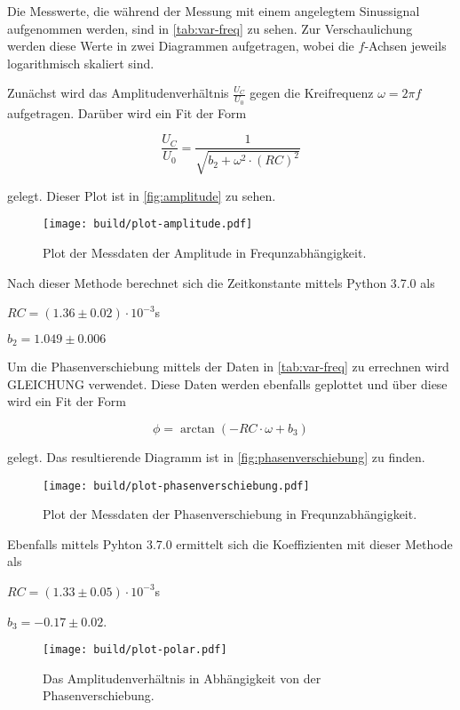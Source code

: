 Die Messwerte, die während der Messung mit einem angelegtem Sinussignal aufgenommen werden, sind in \autoref{tab:var-freq} zu sehen.
Zur Verschaulichung werden diese Werte in zwei Diagrammen aufgetragen, wobei die $f$-Achsen jeweils logarithmisch skaliert sind.



Zunächst wird das Amplitudenverhältnis $\frac{U_C}{U_0}$ gegen die Kreifrequenz $\omega = 2 \pi f$ aufgetragen. Darüber wird ein Fit der Form

\begin{equation}
    \frac{U_C}{U_0} = \frac{1}{\sqrt{ b_2 + \omega^2 \cdot (RC)^2 }}
\end{equation}

gelegt. Dieser Plot ist in \autoref{fig:amplitude} zu sehen.

\begin{figure}
    \centering
    \texttt{[image: build/plot-amplitude.pdf]}
    \caption{Plot der Messdaten der Amplitude in Frequnzabhängigkeit.}
    \label{fig:amplitude}
\end{figure}



Nach dieser Methode berechnet sich die Zeitkonstante mittels Python 3.7.0 als

\begin{centering}
    $RC = (1.36 \pm 0.02) \cdot 10^{-3} $s

    $b_2 = 1.049 \pm 0.006$
\end{centering}

Um die Phasenverschiebung mittels der Daten in \autoref{tab:var-freq} zu errechnen wird GLEICHUNG verwendet.
Diese Daten werden ebenfalls geplottet und über diese wird ein Fit der Form

\begin{equation}
    \phi = \arctan (-RC \cdot \omega + b_3)
\end{equation}

gelegt. Das resultierende Diagramm ist in \autoref{fig:phasenverschiebung} zu finden.

\begin{figure}
    \centering
    \texttt{[image: build/plot-phasenverschiebung.pdf]}
    \caption{Plot der Messdaten der Phasenverschiebung in Frequnzabhängigkeit.}
    \label{fig:phasenverschiebung}
\end{figure}

Ebenfalls mittels Pyhton 3.7.0 ermittelt sich die Koeffizienten mit dieser Methode als

\begin{center}
    $RC = (1.33 \pm 0.05) \cdot 10^{-3}$s

    $b_3 = -0.17 \pm 0.02$.
\end{center}

\begin{figure}
    \centering
    \texttt{[image: build/plot-polar.pdf]}
    \caption{Das Amplitudenverhältnis in Abhängigkeit von der Phasenverschiebung.}
    \label{fig:polar}
\end{figure}